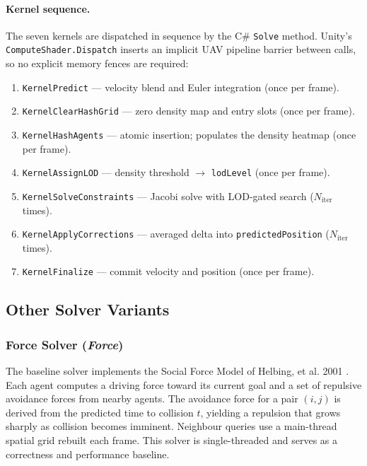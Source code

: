 \paragraph{Kernel sequence.}
The seven kernels are dispatched in sequence by the C\# \texttt{Solve} method.
Unity's \texttt{\allowbreak ComputeShader.Dispatch} inserts an implicit UAV pipeline
barrier between calls, so no explicit memory fences are required:

\begin{enumerate}
    \item \texttt{KernelPredict} --- velocity blend and Euler integration (once per frame).
    \item \texttt{KernelClearHashGrid} --- zero density map and entry slots (once per frame).
    \item \texttt{KernelHashAgents} --- atomic insertion; populates the density heatmap (once per frame).
    \item \texttt{KernelAssignLOD} --- density threshold $\rightarrow$ \texttt{lodLevel} (once per frame).
    \item \texttt{KernelSolveConstraints} --- Jacobi solve with LOD-gated search ($N_{\mathrm{iter}}$ times).
    \item \texttt{KernelApplyCorrections} --- averaged delta into \texttt{predictedPosition} ($N_{\mathrm{iter}}$ times).
    \item \texttt{KernelFinalize} --- commit velocity and position (once per frame).
\end{enumerate}

\subsection{Other Solver Variants}

\subsubsection{Force Solver (\textit{Force})}

The baseline solver implements the Social Force Model of
Helbing, et al. 2001 \cite{helbing1995}.  Each agent computes a
driving force toward its current goal and a set of repulsive avoidance forces
from nearby agents.  The avoidance force for a pair $(i,j)$ is derived from
the predicted time to collision $t$, yielding a repulsion that grows sharply
as collision becomes imminent.  Neighbour queries use a main-thread spatial
grid rebuilt each frame.  This solver is single-threaded and serves as a
correctness and performance baseline.

